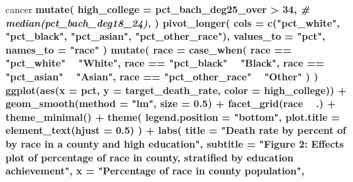 \documentclass[
  11pt,
]{article}
\newenvironment{Shaded}{\begin{snugshade}}{\end{snugshade}}
\newcommand{\CommentTok}[1]{\textcolor[rgb]{0.56,0.35,0.01}{\textit{#1}}}
\newcommand{\DataTypeTok}[1]{\textcolor[rgb]{0.13,0.29,0.53}{#1}}
\newcommand{\DecValTok}[1]{\textcolor[rgb]{0.00,0.00,0.81}{#1}}
\newcommand{\FloatTok}[1]{\textcolor[rgb]{0.00,0.00,0.81}{#1}}
\newcommand{\KeywordTok}[1]{\textcolor[rgb]{0.13,0.29,0.53}{\textbf{#1}}}
\newcommand{\NormalTok}[1]{#1}
\newcommand{\OperatorTok}[1]{\textcolor[rgb]{0.81,0.36,0.00}{\textbf{#1}}}
\newcommand{\StringTok}[1]{\textcolor[rgb]{0.31,0.60,0.02}{#1}}
\begin{document}
\begin{Shaded}
\begin{Highlighting}[]
{{{{{{{{{{{{{{{{{\NormalTok{cancer }\OperatorTok{%
\StringTok{  }\KeywordTok{mutate}\NormalTok{(}
    \DataTypeTok{high_college =}\NormalTok{ pct_bach_deg25_over }\OperatorTok{>}\StringTok{ }\DecValTok{34}\NormalTok{, }\CommentTok{# median(pct_bach_deg18_24),}
\NormalTok{  ) }\OperatorTok{%
\StringTok{  }\KeywordTok{pivot_longer}\NormalTok{(}
    \DataTypeTok{cols =} \KeywordTok{c}\NormalTok{(}\StringTok{"pct_white"}\NormalTok{, }
             \StringTok{"pct_black"}\NormalTok{, }
             \StringTok{"pct_asian"}\NormalTok{,}
             \StringTok{"pct_other_race"}\NormalTok{),}
    \DataTypeTok{values_to =} \StringTok{"pct"}\NormalTok{,}
    \DataTypeTok{names_to =} \StringTok{"race"}
\NormalTok{  ) }\OperatorTok{%
\StringTok{  }\KeywordTok{mutate}\NormalTok{(}
    \DataTypeTok{race =} \KeywordTok{case_when}\NormalTok{(}
\NormalTok{      race }\OperatorTok{==}\StringTok{ "pct_white"} \OperatorTok{~}\StringTok{ "White"}\NormalTok{,}
\NormalTok{      race }\OperatorTok{==}\StringTok{ "pct_black"} \OperatorTok{~}\StringTok{ "Black"}\NormalTok{,}
\NormalTok{      race }\OperatorTok{==}\StringTok{ "pct_asian"} \OperatorTok{~}\StringTok{ "Asian"}\NormalTok{,}
\NormalTok{      race }\OperatorTok{==}\StringTok{ "pct_other_race"} \OperatorTok{~}\StringTok{ "Other"}
\NormalTok{    )}
\NormalTok{  ) }\OperatorTok{%
\StringTok{  }\KeywordTok{ggplot}\NormalTok{(}\KeywordTok{aes}\NormalTok{(}\DataTypeTok{x =}\NormalTok{ pct, }\DataTypeTok{y =}\NormalTok{ target_death_rate, }\DataTypeTok{color =}\NormalTok{ high_college)) }\OperatorTok{+}\StringTok{ }
\StringTok{  }\KeywordTok{geom_smooth}\NormalTok{(}\DataTypeTok{method =} \StringTok{"lm"}\NormalTok{, }\DataTypeTok{size =} \FloatTok{0.5}\NormalTok{) }\OperatorTok{+}
\StringTok{  }\KeywordTok{facet_grid}\NormalTok{(race }\OperatorTok{~}\StringTok{ }\NormalTok{.) }\OperatorTok{+}
\StringTok{  }\KeywordTok{theme_minimal}\NormalTok{() }\OperatorTok{+}
\StringTok{  }\KeywordTok{theme}\NormalTok{(}
    \DataTypeTok{legend.position =} \StringTok{"bottom"}\NormalTok{,}
    \DataTypeTok{plot.title =} \KeywordTok{element_text}\NormalTok{(}\DataTypeTok{hjust =} \FloatTok{0.5}\NormalTok{)}
\NormalTok{  ) }\OperatorTok{+}\StringTok{ }
\StringTok{  }\KeywordTok{labs}\NormalTok{(}
    \DataTypeTok{title =} \StringTok{"Death rate by percent of by race in a county and high education"}\NormalTok{,}
    \DataTypeTok{subtitle =} \StringTok{"Figure 2: Effects plot of percentage of race in county, stratified by education achievement"}\NormalTok{,}
    \DataTypeTok{x =} \StringTok{"Percentage of race in county population"}\NormalTok{,}
}}}}}}}}}}}}}}}}}}}}}
\end{Highlighting}
\end{Shaded}
\end{document}
